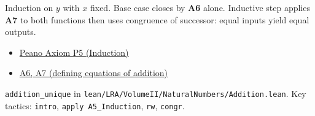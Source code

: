 \begin{remark*}
Induction on $y$ with $x$ fixed. Base case closes by \textbf{A6} alone.
Inductive step applies \textbf{A7} to both functions then uses congruence of
successor: equal inputs yield equal outputs.

\end{remark*}

\begin{dependencies}
\begin{itemize}
  \item \hyperref[ax:landau-peano]{Peano Axiom P5 (Induction)}
  \item \hyperref[thm:landau-addition-exists-unique]{A6, A7 (defining equations of addition)}
\end{itemize}

\end{dependencies}

\begin{remark*}
\texttt{addition\_unique} in
\texttt{lean/LRA/VolumeII/NaturalNumbers/Addition.lean}.
Key tactics: \texttt{intro}, \texttt{apply A5\_Induction},
\texttt{rw}, \texttt{congr}.
\end{remark*}

\clearpage
